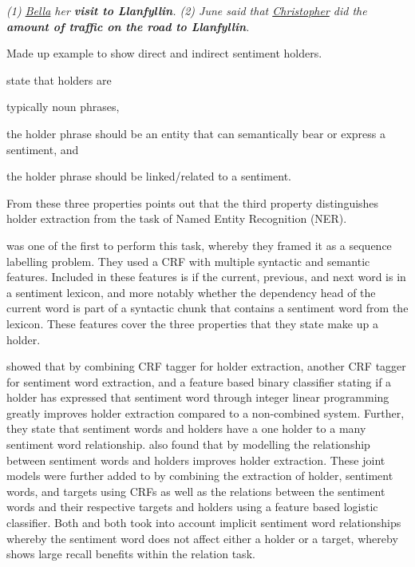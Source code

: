 \begin{example}
\textit{(1) \underline{Bella}  her \textbf{visit to Llanfyllin}. (2) June said that \underline{Christopher} did  the \textbf{amount of  traffic on the road to Llanfyllin}.}
\caption{Made up example to show direct and indirect sentiment holders.}
\label{example:lit_review_sentiment_holder_extraction_direct_indirect}
\end{example}

\citet{choi-etal-2005-identifying} state that holders are 
\begin{enumerate*}[label=\roman*)]
    \item typically noun phrases,
    \item the holder phrase should be an entity that can semantically bear or express a sentiment, and
    \item the holder phrase should be linked/related to a sentiment.
\end{enumerate*}
From these three properties \citet{choi-etal-2005-identifying} points out that the third property distinguishes holder extraction from the task of Named Entity Recognition (NER).

\citet{choi-etal-2005-identifying} was one of the first to perform this task, whereby they framed it as a sequence labelling problem. They used a CRF with multiple syntactic and semantic features. Included in these features is if the current, previous, and next word is in a sentiment lexicon, and more notably whether the dependency head of the current word is part of a syntactic chunk that contains a sentiment word from the lexicon. These features cover the three properties that they state make up a holder. 


\citet{choi-etal-2006-joint} showed that by combining \citet{choi-etal-2005-identifying} CRF tagger for holder extraction, another CRF tagger for sentiment word extraction, and a feature based binary classifier stating if a holder has expressed that sentiment word through integer linear programming greatly improves holder extraction compared to a non-combined system. Further, they state that sentiment words and holders have a one holder to a many sentiment word relationship. \citet{johansson-moschitti-2010-reranking} also found that by modelling the relationship between sentiment words and holders improves holder extraction. These joint models were further added to by \citet{yang-cardie-2013-joint} combining the extraction of holder, sentiment words, and targets using CRFs as well as the relations between the sentiment words and their respective targets and holders using a feature based logistic classifier. Both \citet{johansson-moschitti-2010-reranking} and \citet{yang-cardie-2013-joint} both took into account implicit sentiment word relationships whereby the sentiment word does not affect either a holder or a target, whereby \citet{yang-cardie-2013-joint} shows large recall benefits within the relation task.

